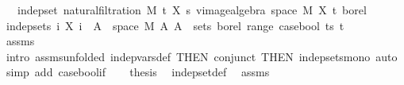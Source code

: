 \begin{isabellebody}
\ \ \ {\isachardoublequoteopen}indep{\isacharunderscore}{\kern0pt}set\ {\isacharparenleft}{\kern0pt}natural{\isacharunderscore}{\kern0pt}filtration\ M\ t\ X\ s{\isacharparenright}{\kern0pt}\ {\isacharparenleft}{\kern0pt}vimage{\isacharunderscore}{\kern0pt}algebra\ {\isacharparenleft}{\kern0pt}space\ M{\isacharparenright}{\kern0pt}\ {\isacharparenleft}{\kern0pt}X\ t{\isacharparenright}{\kern0pt}\ borel{\isacharparenright}{\kern0pt}{\isachardoublequoteclose}\isanewline
%
\isadelimproof
%
\endisadelimproof
%
\isatagproof
{}\isamarkupfalse%
\ {\isacharminus}{\kern0pt}\isanewline
\ \ \isamarkupfalse%
\ {\isachardoublequoteopen}indep{\isacharunderscore}{\kern0pt}sets\ {\isacharparenleft}{\kern0pt}{\isasymlambda}i{\isachardot}{\kern0pt}\ {\isacharbraceleft}{\kern0pt}X\ i\ {\isacharminus}{\kern0pt}{\isacharbackquote}{\kern0pt}\ A\ {\isasyminter}\ space\ M\ {\isacharbar}{\kern0pt}A{\isachardot}{\kern0pt}\ A\ {\isasymin}\ sets\ borel{\isacharbraceright}{\kern0pt}{\isacharparenright}{\kern0pt}\ {\isacharparenleft}{\kern0pt}{\isasymUnion}{\isacharparenleft}{\kern0pt}range\ {\isacharparenleft}{\kern0pt}case{\isacharunderscore}{\kern0pt}bool\ {\isacharbraceleft}{\kern0pt}ts{\isacharbraceright}{\kern0pt}\ {\isacharbraceleft}{\kern0pt}t{\isacharbraceright}{\kern0pt}{\isacharparenright}{\kern0pt}{\isacharparenright}{\kern0pt}{\isacharparenright}{\kern0pt}{\isachardoublequoteclose}\ \isanewline
\ \ \ \ \isamarkupfalse%
\ assms\ \isanewline
\ \ \ \ \isamarkupfalse%
\ {\isacharparenleft}{\kern0pt}intro\ assms{\isacharparenleft}{\kern0pt}{}{\isacharparenright}{\kern0pt}{\isacharbrackleft}{\kern0pt}unfolded\ indep{\isacharunderscore}{\kern0pt}vars{\isacharunderscore}{\kern0pt}def{\isacharcomma}{\kern0pt}\ THEN\ conjunct{}{\isacharcomma}{\kern0pt}\ THEN\ indep{\isacharunderscore}{\kern0pt}sets{\isacharunderscore}{\kern0pt}mono{\isacharbrackright}{\kern0pt}{\isacharparenright}{\kern0pt}\ {\isacharparenleft}{\kern0pt}auto\ simp\ add{\isacharcolon}{\kern0pt}\ case{\isacharunderscore}{\kern0pt}bool{\isacharunderscore}{\kern0pt}if{\isacharparenright}{\kern0pt}\isanewline
\ \ \isamarkupfalse%
\ {\isacharquery}{\kern0pt}thesis\ \isamarkupfalse%
\ indep{\isacharunderscore}{\kern0pt}set{\isacharunderscore}{\kern0pt}def\ \isamarkupfalse%
\ assms\isanewline
\ \ \ \ \isamarkupfalse%

\end{isabellebody}
